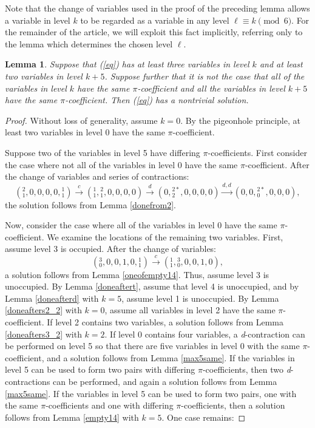 \documentclass{article}
\newtheorem{lemma}{Lemma}
\begin{document}
Note that the change of variables used in the proof of the preceding lemma allows a variable in level $k$ to be regarded as a variable in any level $\ell \equiv k \pmod{6}$.  For the remainder of the article, we will exploit this fact implicitly, referring only to the lemma which determines the chosen level $\ell$.

\begin{lemma}\label{3and2same}
Suppose that (\ref{eq}) has at least three variables in level $k$ and at least two variables in level $k+5$.  Suppose further that it is not the case that all of the variables in level $k$ have the same $\pi$-coefficient and all the variables in level $k+5$ have the same $\pi$-coefficient. Then (\ref{eq}) has a nontrivial solution.
\end{lemma}
\begin{proof}

Without loss of generality, assume $k=0$.  By the pigeonhole principle, at least two variables in level 0 have the same $\pi$-coefficient.

Suppose two of the variables in level 5 have differing $\pi$-coefficients. First consider the case where not all of the variables in level 0 have the same $\pi$-coefficient.  After the change of variables and series of contractions:
$$({}^{2}_{1},0,0,0,0,{}^{1}_{1}) \xrightarrow{c} ({}^{1}_{1},{}^{2}_{1},0,0,0,0) \xrightarrow{d} (0,{}^{2*}_{2},0,0,0,0) \xrightarrow{d,d} (0,0,{}^{2*}_{0},0,0,0),$$
the solution follows from Lemma \ref{donefrom2}.

Now, consider the case where all of the variables in level 0 have the same $\pi$-coefficient.  We examine the locations of the remaining two variables.  First, assume level 3 is occupied.  After the change of variables:
$$({}^{3}_{0},0,0,1,0,{}^{1}_{1}) \xrightarrow{c} ({}^{1}_{1},{}^{3}_{0},0,0,1,0),$$
a solution follows from Lemma \ref{oneofempty14}.  Thus, assume level 3 is unoccupied.  By Lemma \ref{doneaftert}, assume that level 4 is unoccupied, and by Lemma \ref{doneafterd} with $k=5$, assume level 1 is unoccupied.  By Lemma \ref{doneafters2_2} with $k=0$, assume all variables in level 2 have the same $\pi$-coefficient.  If level 2 contains two variables, a solution follows from Lemma \ref{doneafters3_2} with $k=2$.  If level 0 contains four variables, a \textit{d}-contraction can be performed on level 5 so that there are five variables in level 0 with the same $\pi$-coefficient, and a solution follows from Lemma \ref{max5same}.  If the variables in level 5 can be used to form two pairs with differing $\pi$-coefficients, then two \textit{d}-contractions can be performed, and again a solution follows from Lemma \ref{max5same}.  If the variables in level 5 can be used to form two pairs, one with the same $\pi$-coefficients and one with differing $\pi$-coefficients, then a solution follows from Lemma  \ref{empty14} with $k=5$.  One case remains:


\end{proof}
\end{document}
